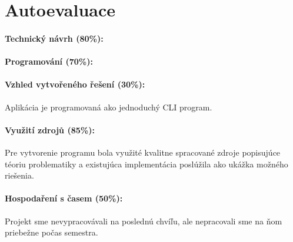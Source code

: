 \documentclass[11pt,a4paper]{article}
\begin{document}

\section{Autoevaluace}


\paragraph{Technický návrh (80\%):} 

\paragraph{Programování (70\%):} 

\paragraph{Vzhled vytvořeného řešení (30\%):}
Aplikácia je programovaná ako jednoduchý CLI program.

\paragraph{Využití zdrojů (85\%):} 
Pre vytvorenie programu bola využité kvalitne spracované zdroje popisujúce téoriu problematiky a existujúca implementácia poslúžila ako ukážka možného riešenia.

\paragraph{Hospodaření s časem (50\%):} 
Projekt sme nevypracovávali na poslednú chvíľu, ale nepracovali sme na ňom priebežne počas semestra.
\end{document}
